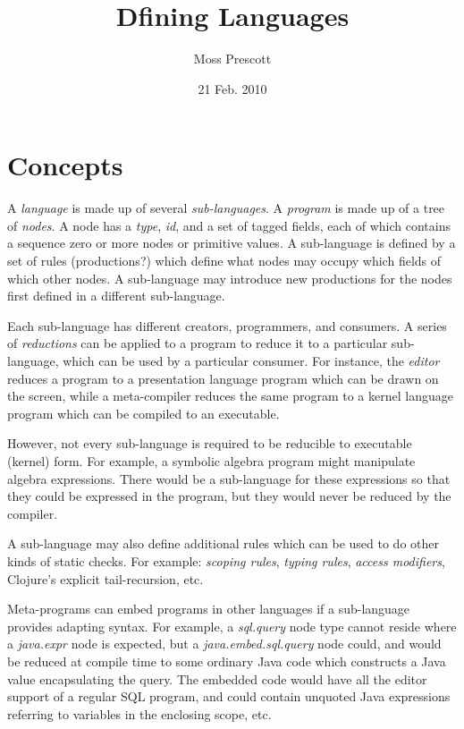 \documentclass[110pt]{amsart}
\title{Dfining Languages}
\author{Moss Prescott}
\date{21 Feb. 2010}
\begin{document}
\maketitle

\section{Concepts}
A \emph{language} is made up of several \emph{sub-languages}. A \emph{program} is made up of a tree of \emph{nodes}. A node has a \emph{type}, \emph{id}, and a set of tagged fields, each of which contains a sequence zero or more nodes or primitive values. A sub-language is defined by a set of rules (productions?) which define what nodes may occupy which fields of which other nodes. A sub-language may introduce new productions for the nodes first defined in a different sub-language.

Each sub-language has different creators, programmers, and consumers. A series of \emph{reductions} can be applied to a program to reduce it to a particular sub-language, which can be used by a particular consumer. For instance, the \emph{editor} reduces a program to a presentation language program which can be drawn on the screen, while a meta-compiler reduces the same program to a kernel language program which can be compiled to an executable.

However, not every sub-language is required to be reducible to executable (kernel) form. For example, a symbolic algebra program might manipulate algebra expressions. There would be a sub-language for these expressions so that they could be expressed in the program, but they would never be reduced by the compiler.

A sub-language may also define additional rules which can be used to do other kinds of static checks. For example: \emph{scoping rules}, \emph{typing rules}, \emph{access modifiers}, Clojure's explicit tail-recursion, etc.

Meta-programs can embed programs in other languages if a sub-language provides adapting syntax. For example, a \emph{sql.query} node type cannot reside where a \emph{java.expr} node is expected, but a \emph{java.embed.sql.query} node could, and would be reduced at compile time to some ordinary Java code which constructs a Java value encapsulating the query. The embedded code would have all the editor support of a regular SQL program, and could contain unquoted Java expressions referring to variables in the enclosing scope, etc.
\end{document}
